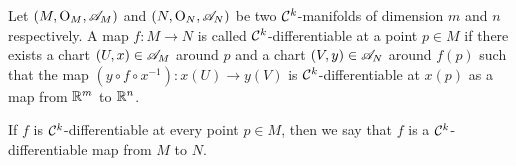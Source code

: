 \begin{definition}[Differentiability]
	Let \((M, \mathrm{O}_M, \mathscr{A}_M)\) and \((N, \mathrm{O}_N, \mathscr{A}_N)\) be two \(\mathcal C^{k}\)-manifolds of dimension \(m\) and \(n\) respectively. A map \(f: M \to N\) is called \(\mathcal C^{k}\)-differentiable at a point \(p \in M\) if there exists a chart \((U, x) \in \mathscr{A}_M\) around \(p\) and a chart \((V, y) \in \mathscr{A}_N\) around \(f(p)\) such that the map \((y \circ f \circ x^{-1}): x(U) \to y(V)\) is \(\mathcal C^{k}\)-differentiable at \(x(p)\) as a map from \(\mathbb R^m\) to \(\mathbb R^n\).
	\begin{figure}[H]
		\centering
	\end{figure}
	If \(f\) is \(\mathcal C^{k}\)-differentiable at every point \(p \in M\), then we say that \(f\) is a \(\mathcal C^{k}\)-differentiable map from \(M\) to \(N\).
\end{definition}

